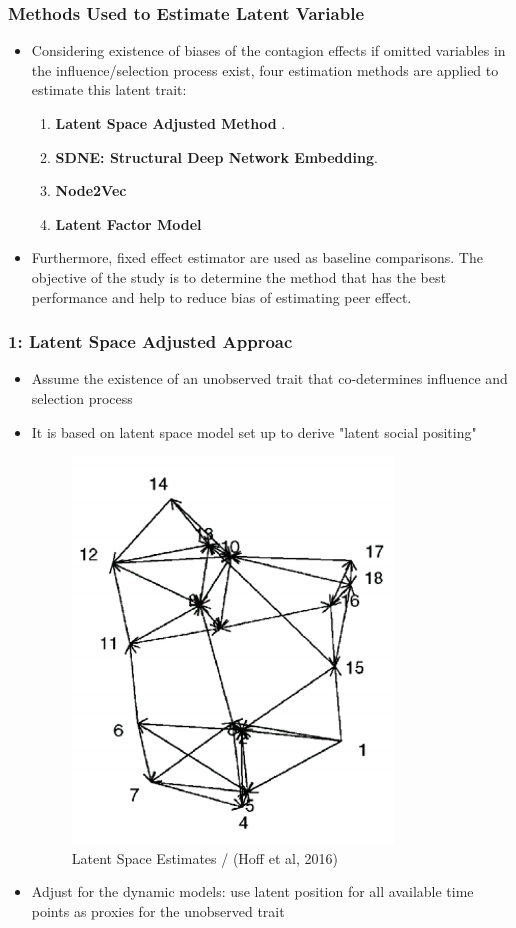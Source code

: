 \documentclass{beamer}
\begin{document}
\begin{frame}
\frametitle{Methods Used to Estimate Latent Variable }
\begin{itemize}
\item Considering existence of biases of the contagion effects if omitted variables in the influence/selection process exist, four estimation methods are applied to estimate this latent trait: 
\vspace{10pt}
\begin{itemize}
\begin{enumerate}
 \item \textbf{Latent Space Adjusted Method}  \textit{\cite{XU2018101}}.
\vspace{10pt}
\item \textbf{SDNE: Structural Deep Network Embedding}\textit{\cite{wang2016structural}}.
\vspace {10pt}
\item \textbf{Node2Vec} \textit{\cite{DBLP:journals/corr/GroverL16}}
\vspace {10pt}
\item \textbf{Latent Factor Model} \textit{\cite{minhas2019inferential}}
\end{enumerate}
\end{itemize}
\vspace {10pt}
\item Furthermore, fixed  effect estimator are used  as baseline comparisons. The objective of the study is to determine the method that has the best performance and help to reduce bias of estimating peer effect.
\end{itemize}
\end{frame}
\begin{frame}
\frametitle{ 1: Latent Space Adjusted Approac}
\begin{itemize}
\item Assume the existence of an unobserved trait that co-determines influence and selection process
\vspace{10pt}
\item  It is based on latent space  model set up \cite{hoff2002latent} to derive "latent social positing" 
\begin{figure}[h!]
  \centering
  \includegraphics[width=.25\linewidth]{pff.png}
  \caption{Latent Space Estimates / (Hoff et al, 2016)}
  \label{fig:fig1}
\end{figure}
\item Adjust for the dynamic models: use latent position for all available time points as proxies for the unobserved trait
\end{itemize}
\end{frame}
\end{document}
